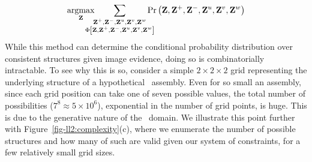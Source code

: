 \par\vspace*{-2ex}
\begin{equation}
  \argmax_{\mathbf{Z}}\hspace{-13pt}
  \sum_{\substack{\mathbf{Z}^+,\mathbf{Z}^-,\mathbf{Z}^u,\mathbf{Z}^v,\mathbf{Z}^w\\
      \Phi\left[\mathbf{Z},\mathbf{Z}^+,\mathbf{Z}^-,\mathbf{Z}^u,\mathbf{Z}^v,\mathbf{Z}^w\right]}}
  \hspace{-10pt}\Pr\left(\mathbf{Z},\mathbf{Z}^{+},\mathbf{Z}^{-},\mathbf{Z}^u,\mathbf{Z}^v,\mathbf{Z}^w\right)
  \label{eq:structure-estimation}
\end{equation}
%
While this method can determine the conditional probability distribution over
consistent structures given image evidence, doing so is combinatorially
intractable.
%
To see why this is so, consider a simple $2 \times 2 \times 2$ grid
representing the underlying structure of a hypothetical \LincolnLog\ assembly.
%
Even for so small an assembly, since each grid position can take one of seven
possible values, the total number of possibilities ($7^8 \approx 5 \times
10^6$), exponential in the number of grid points, is huge.
%
This is due to the generative nature of the \LincolnLog\ domain.
%
We illustrate this point further with Figure~\ref{fig-ll2:complexity}(c), where we
enumerate the number of possible structures and how many of such are valid
given our system of constraints, for a few relatively small grid sizes.

